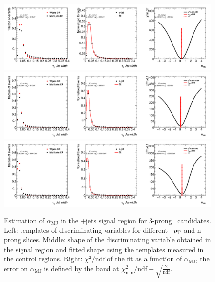 		\begin{figure}
		\begin{center}
		  \includegraphics[width=1\textwidth]{chapters/chapter6_HPlus/images/FFs/FFs_FIT_SR_TAUJET_3_40_60.png}
		\includegraphics[width=1\textwidth]{chapters/chapter6_HPlus/images/FFs/FFs_FIT_SR_TAUJET_3_60_80.png}
		\includegraphics[width=1\textwidth]{chapters/chapter6_HPlus/images/FFs/FFs_FIT_SR_TAUJET_3_80_3500.png}

		\end{center}
		\caption{
		Estimation of $\alpha_\mathrm{MJ}$ in the \tauhad+jets signal region for
		3-prong \tauhad\ candidates. Left: templates of discriminating variables for different \tauhad\ $p_{\text{T}}$
		and n-prong slices. Middle: shape of the discriminating variable obtained in the signal region and fitted
		shape using the templates measured in the control regions. Right: $\chi^2/\mathrm{ndf}$ of the fit as a
		function of $\alpha_\mathrm{MJ}$, the error on $\alpha_\mathrm{MJ}$ is defined by the band at
		$\chi^2_\mathrm{min}/\mathrm{ndf}+\sqrt{\frac{2}{\mathrm{ndf}}}$.
		}
		\label{fig:mm:Fits:region3_3}
		\end{figure}

